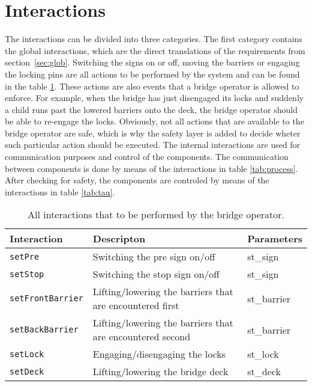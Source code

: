 \section{Interactions}
\label{sec:act}

The interactions can be divided into three categories. The first category contains the global interactions, which are the direct translations of the requirements from section~\ref{sec:glob}.
Switching the signs on or off, moving the barriers or engaging the locking pins are all actions to be performed by the system and can be found in the table \ref{tab:glob}. These actions are also events that a bridge operator is allowed to enforce. For example, when the bridge has just disengaged its locks and suddenly a child runs past the lowered barriers onto the deck, the bridge operator should be able to re-engage the locks. Obviously, not all actions that are available to the bridge operator are safe, which is why the safety layer is added to decide wheter such particular action should be executed.
The internal interactions are used for communication purposes and control of the components. The communication between components is done by means of the interactions in table \ref{tab:process}. After checking for safety, the components are controled by means of the interactions in table \ref{tab:tau}.
%
\begin{table}[htb]%
\begin{tabular}{lll}
      \textbf{Interaction} &	\textbf{Descripton}	&	\textbf{Parameters}\\
      \hline
      \texttt{setPre} & Switching the pre sign on/off & st\_sign\\
      \texttt{setStop} & Switching the stop sign on/off & st\_sign\\
      \texttt{setFrontBarrier} & Lifting/lowering the barriers that are encountered first & st\_barrier\\
      \texttt{setBackBarrier} & Lifting/lowering the barriers that are encountered second & st\_barrier\\
      \texttt{setLock} & Engaging/disengaging the locks & st\_lock\\
      \texttt{setDeck} & Lifting/lowering the bridge deck & st\_deck\\
\end{tabular}
\caption{All interactions that to be performed by the bridge operator.}
\label{tab:glob}
\end{table}
%
